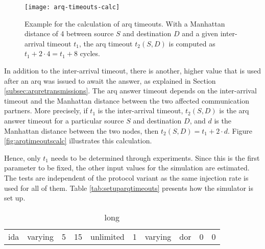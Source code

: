 \begin{figure}
    \centering
    \texttt{[image: arq-timeouts-calc]}
    \caption[Example of ARQ timeout calculation]{Example for the calculation of \gls{arq} timeouts. With a Manhattan distance of 4 between source $S$ and
    destination $D$ and a given inter-arrival timeout $t_1$, the \gls{arq} timeout $t_2(S, D)$ is computed as $t_1 + 2 \cdot 4 = t_1 + 8$ cycles.}
    \label{fig:arqtimeoutscalc}
\end{figure}

In addition to the inter-arrival timeout, there is another, higher value that is used after an \gls{arq} was issued to await the answer, as explained
in Section \ref{subsec:arqretransmissions}. The \gls{arq} answer timeout depends on the inter-arrival timeout and the Manhattan distance between the
two affected communication partners. More precisely, if $t_1$ is the inter-arrival timeout, $t_2(S, D)$ is the \gls{arq} answer timeout for a
particular source $S$ and destination $D$, and $d$ is the Manhattan distance between the two nodes, then $t_2(S, D) = t_1 + 2 \cdot d$. Figure
\vref{fig:arqtimeoutscalc} illustrates this calculation.

Hence, only $t_1$ needs to be determined through experiments. Since this is the first parameter to be fixed, the other input values for the simulation
are estimated. The tests are independent of the protocol variant as the same injection rate is used for all of them. Table \vref{tab:setuparqtimeouts}
presents how the simulator is set up.

\begin{table}
    \centering
    \begin{tabulary}{\textwidth}{C|C|C|C|C|C|C|C|C|C}
        \pProtVar{} & \pNCMode{} & \pEncMods{} & \pAuthMods{} & \pRQSize{} & \pARQLimit{} & \pARQTimeout{} & \pRStrat{} & \pNumAttackers{} & \pAttackProb{} \\\hline
        \gls{ida}   & varying    & 5           & 15           & unlimited  & 1            & varying        & \gls{dor}  & 0                & 0 \\
    \end{tabulary}
    \caption[Input parameters for ARQ timeouts experiment]{long}
    \label{tab:setuparqtimeouts}
\end{table}

